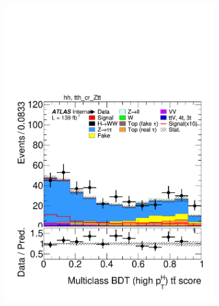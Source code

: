 \begin{figure}[h]
\begin{subfigure}[b]{0.32\textwidth}
    \includegraphics[width=\textwidth]{images/sr_cr_plots/plot_tth_ttbar_multiclass_gt200_hh_tth_cr_Ztt.pdf}
    \caption{}
  \end{subfigure}
  \begin{subfigure}[b]{0.32\textwidth}

\end{subfigure}
\end{figure}
